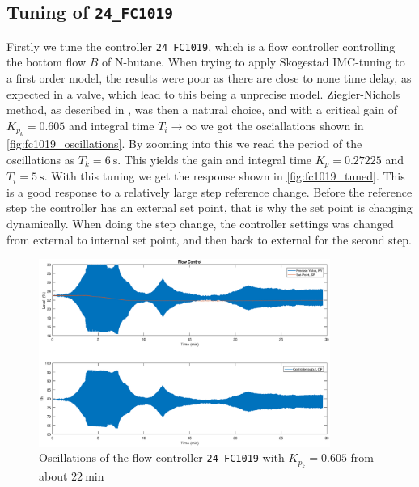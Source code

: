 \subsection{Tuning of \texttt{24\_FC1019}}
Firstly we tune the controller \texttt{24\_FC1019}, which is a flow controller controlling the bottom flow $B$ of N-butane. When trying to apply Skogestad IMC-tuning to a first order model, the results were poor as there are close to none time delay, as expected in a valve, which lead to this being a unprecise model. Ziegler-Nichols method, as described in \cite{balchen2003reguleringsteknikk}, was then a natural choice, and with a critical gain of $K_{p_k} = 0.605$ and integral time $T_i \to\infty$ we got the osciallations shown in \autoref{fig:fc1019_oscillations}. By zooming into this we read the period of the oscillations as $T_k = \SI{6}{\second}$. This yields the gain and integral time $K_p = 0.27225$ and $T_i = \SI{5}{\second}$. With this tuning we get the response shown in \autoref{fig:fc1019_tuned}. This is a good response to a relatively large step reference change. Before the reference step the controller has an external set point, that is why the set point is changing dynamically. When doing the step change, the controller settings was changed from external to internal set point, and then back to external for the second step.

\begin{figure}[ht!]
	\centering
	\includegraphics[width=0.85\textwidth]{fig/tuning/FC1019_critical.eps}
	\caption{Oscillations of the flow controller \texttt{24\_FC1019} with $K_{p_k} = 0.605$ from about $\SI{22}{\minute}$}
	\label{fig:fc1019_oscillations}
\end{figure}

